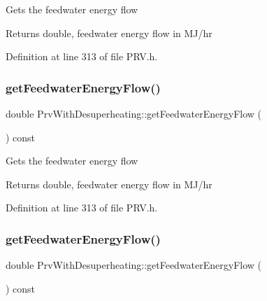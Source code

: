 Gets the feedwater energy flow \begin{DoxyReturn}{Returns}
double, feedwater energy flow in M\+J/hr 
\end{DoxyReturn}


Definition at line 313 of file P\+R\+V.\+h.

\mbox{\label{class_prv_with_desuperheating_a42945a77fcdbaf1e1844c444c696f8b0}} 
\subsubsection{\texorpdfstring{get\+Feedwater\+Energy\+Flow()}{getFeedwaterEnergyFlow()}\hspace{0.1cm}{\footnotesize\ttfamily [2/3]}}
{\footnotesize\ttfamily double Prv\+With\+Desuperheating\+::get\+Feedwater\+Energy\+Flow (\begin{DoxyParamCaption}{ }\end{DoxyParamCaption}) const\hspace{0.3cm}{\ttfamily [inline]}}

Gets the feedwater energy flow \begin{DoxyReturn}{Returns}
double, feedwater energy flow in M\+J/hr 
\end{DoxyReturn}


Definition at line 313 of file P\+R\+V.\+h.

\mbox{\label{class_prv_with_desuperheating_a42945a77fcdbaf1e1844c444c696f8b0}} 
\subsubsection{\texorpdfstring{get\+Feedwater\+Energy\+Flow()}{getFeedwaterEnergyFlow()}\hspace{0.1cm}{\footnotesize\ttfamily [3/3]}}
{\footnotesize\ttfamily double Prv\+With\+Desuperheating\+::get\+Feedwater\+Energy\+Flow (\begin{DoxyParamCaption}{ }\end{DoxyParamCaption}) const\hspace{0.3cm}{\ttfamily [inline]}}

